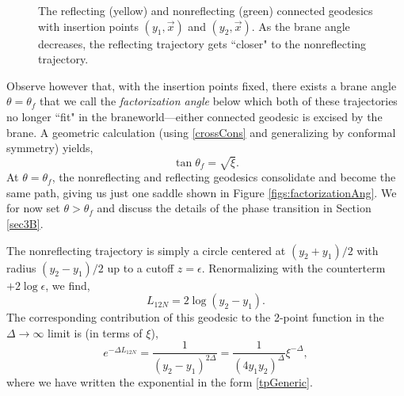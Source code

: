\documentclass[reprint,amsmath,amssymb,aps,nofootinbib,twocolumn]{revtex4-2}
\begin{document}
\begin{figure}
{}
\caption{The reflecting (yellow) and nonreflecting (green) connected geodesics with insertion points $(y_1,\vec{x})$ and $(y_2,\vec{x})$. As the brane angle decreases, the reflecting trajectory gets ``closer" to the nonreflecting trajectory.}
\label{figs:2ptSaddles}
\end{figure}

Observe however that, with the insertion points fixed, there exists a brane angle $\theta = \theta_f$ that we call the \textit{factorization angle} below which both of these trajectories no longer ``fit" in the braneworld---either connected geodesic is excised by the brane. A geometric calculation (using \eqref{crossCons} and generalizing by conformal symmetry)
yields,
\begin{equation}
\tan\theta_f = \sqrt{\xi}.\label{factorAng}
\end{equation}
At $\theta = \theta_f$, the nonreflecting and reflecting geodesics consolidate and become the same path, giving us just one saddle shown in Figure \ref{figs:factorizationAng}. We for now set $\theta > \theta_f$ and discuss the details of the phase transition in Section \ref{sec3B}.

The nonreflecting trajectory is simply a circle centered at $(y_2+y_1)/2$ with radius $(y_2-y_1)/2$ up to a cutoff $z = \epsilon$. Renormalizing with the counterterm $+2\log\epsilon$, we find,
\begin{equation}
L_{12N} = 2\log(y_2 - y_1).
\end{equation}
The corresponding contribution of this geodesic to the 2-point function in the $\Delta \to \infty$ limit is (in terms of $\xi$),
\begin{equation}
e^{-\Delta L_{12N}} = \frac{1}{(y_2 - y_1)^{2\Delta}} = \frac{1}{(4y_1 y_2)^\Delta} \xi^{-\Delta},\label{contributionN}
\end{equation}
where we have written the exponential in the form \eqref{tpGeneric}.
\end{document}
